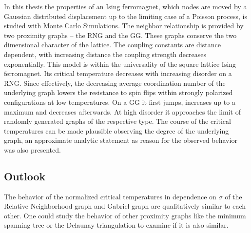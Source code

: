 In this thesis the properties of an Ising ferromagnet, which nodes are
moved by a Gaussian distributed displacement up to the limiting case of
a Poisson process, is studied with Monte Carlo
Simulations. The neighbor relationship is provided by two proximity graphs
-- the RNG and the GG. These graphs conserve the two dimensional character
of the lattice. The coupling constants
are distance dependent, with increasing distance the coupling strength
decreases exponentially.
This model is within the universality of the square lattice Ising
ferromagnet. Its critical temperature decreases with increasing disorder
on a RNG. Since effectively, the decreasing average coordination number
of the underlying graph lowers the resistance to spin flips within
strongly polarized configurations at low temperatures.
 On a GG it first jumps, increases up to a maximum and decreases
afterwards. At high disorder it approaches the limit of randomly generated
graphs of the respective type. The course of the critical temperatures
can be made plausible observing the degree of the underlying graph, an
approximate analytic statement as reason for the observed behavior was
also presented.

\subsection{Outlook}
    The behavior of the normalized critical temperatures in dependence
    on \(\sigma\) of the Relative Neighborhood graph and Gabriel graph
    are qualitatively similar to each other. One could study the behavior
    of other proximity graphs like the minimum spanning tree or the
    Delaunay triangulation to examine if it is also similar.\\
